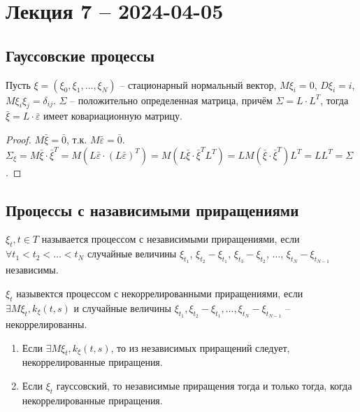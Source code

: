 \section{Лекция 7 -- 2024-04-05}
\subsection{Гауссовские процессы}
\begin{theorem}
  Пусть $\xi = (\xi_0, \xi_1, \dots, \xi_N)$ -- стационарный нормальный вектор,
  $M\xi_i = 0$, $D\xi_i = i$, $M\xi_i \xi_j = \delta_{ij}$. $\Sigma$ -- положительно определенная матрица,
  причём $\Sigma = L \cdot L^T$, тогда $\bar{\xi} = L \cdot \bar{\varepsilon}$ имеет ковариационную матрицу.
\end{theorem}
\begin{proof}
  $M\bar{\xi} = \bar{0}$, т.к. $M\bar{\varepsilon} = \bar{0}$.
  $\Sigma_{\xi} = M \bar{\xi} \cdot \bar{\xi}^T = M(L \bar{\varepsilon} \cdot (L\bar{\varepsilon})^T) = M(L \bar{\xi} \cdot \bar{\xi}^T L^T) = L M(\bar{\xi} \cdot \bar{\xi}^T) L^T = L L^T = \Sigma$.
\end{proof}



\subsection{Процессы с назависимыми приращениями}

\begin{definition}
  $\xi_t, t \in T$ называется процессом с независимыми приращениями, если
  $\forall t_1 < t_2 < \dots < t_N$ случайные величины $\xi_{t_1}$, $\xi_{t_2}-\xi_{t_1}$,
  $\xi_{t_3}-\xi_{t_2}$, $\dots$, $\xi_{t_N} - \xi_{t_{N-1}}$ независимы.
\end{definition}

\begin{definition}
  $\xi_t$ назывектся процессом с некоррелированными приращениями, если
  $\exists M \xi_t, k_\xi (t, s)$ и случайные величины $\xi_{t_1}, \xi_{t_2}-\xi_{t_1}, \dots, \xi_{t_N} - \xi_{t_{N-1}}$ -- некоррелированны.
\end{definition}

\begin{remark}
  \begin{enumerate}
      \item Если $\exists M \xi_{t}, k_\xi(t, s)$, то из независимых приращений
        следует, некоррелированные приращения.

      \item Если $\xi_t$ гауссовский, то независимые приращения тогда и только тогда, 
        когда некоррелированные приращения.
  \end{enumerate}
\end{remark}

